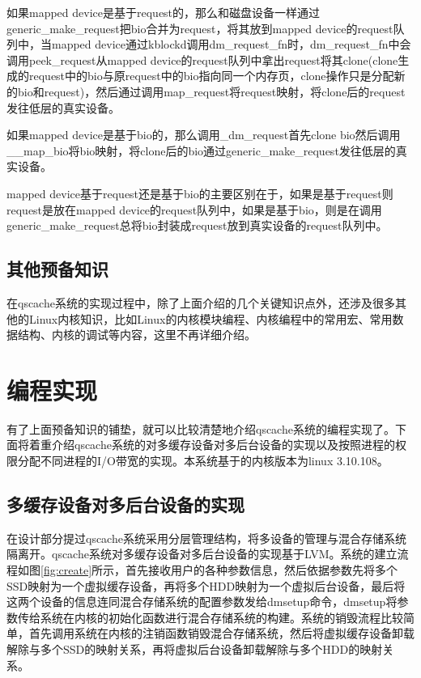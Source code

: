 如果mapped device是基于request的，那么和磁盘设备一样通过generic\_make\_request把bio合并为request，将其放到mapped device的request队列中，当mapped device通过kblockd调用dm\_request\_fn时，dm\_request\_fn中会调用peek\_request从mapped device的request队列中拿出request将其clone(clone生成的request中的bio与原request中的bio指向同一个内存页，clone操作只是分配新的bio和request)，然后通过调用map\_request将request映射，将clone后的request发往低层的真实设备。

如果mapped device是基于bio的，那么调用\_dm\_request首先clone bio然后调用\_\_map\_bio将bio映射，将clone后的bio通过generic\_make\_request发往低层的真实设备。

mapped device基于request还是基于bio的主要区别在于，如果是基于request则request是放在mapped device的request队列中，如果是基于bio，则是在调用generic\_make\_request总将bio封装成request放到真实设备的request队列中。


\subsection{其他预备知识}

在qscache系统的实现过程中，除了上面介绍的几个关键知识点外，还涉及很多其他的Linux内核知识，比如Linux的内核模块编程、内核编程中的常用宏、常用数据结构、内核的调试等内容，这里不再详细介绍。

\section{编程实现}

有了上面预备知识的铺垫，就可以比较清楚地介绍qscache系统的编程实现了。下面将着重介绍qscache系统的对多缓存设备对多后台设备的实现以及按照进程的权限分配不同进程的I/O带宽的实现。本系统基于的内核版本为linux 3.10.108。

\subsection{多缓存设备对多后台设备的实现}

在设计部分提过qscache系统采用分层管理结构，将多设备的管理与混合存储系统隔离开。qscache系统对多缓存设备对多后台设备的实现基于LVM。系统的建立流程如图\ref{fig:create}所示，首先接收用户的各种参数信息，然后依据参数先将多个SSD映射为一个虚拟缓存设备，再将多个HDD映射为一个虚拟后台设备，最后将这两个设备的信息连同混合存储系统的配置参数发给dmsetup命令，dmsetup将参数传给系统在内核的初始化函数进行混合存储系统的构建。系统的销毁流程比较简单，首先调用系统在内核的注销函数销毁混合存储系统，然后将虚拟缓存设备卸载解除与多个SSD的映射关系，再将虚拟后台设备卸载解除与多个HDD的映射关系。

